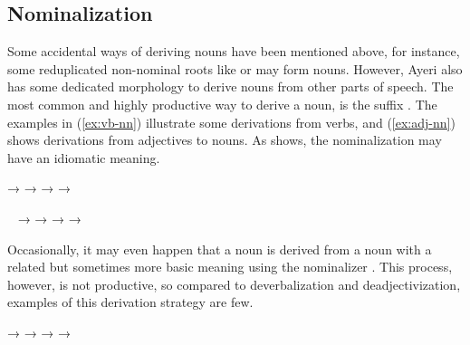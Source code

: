\subsection{Nominalization}

Some accidental ways of deriving nouns have been mentioned above, for instance, 
some reduplicated non-nominal roots like  or 
 may form nouns. However, Ayeri also has some 
dedicated morphology to derive nouns from other parts of speech. The most 
common and highly productive way to derive a noun, is the suffix 
. The examples in (\ref{ex:vb-nn}) illustrate some derivations 
from verbs, and (\ref{ex:adj-nn}) shows derivations from adjectives to nouns. 
As  shows, the nominalization may have an idiomatic 
meaning.

\pex\label{ex:vb-nn}
	\a {}
		→ 
	\a {}
		→ 
	\a {}
		→ 
	\a {}
		→ 
\xe

\pex~\label{ex:adj-nn}
	\a {}
		→ 
	\a {}
		→ 
	\a {}
		→ 
	\a {}
		→ 
\xe

Occasionally, it may even happen that a noun is derived from a noun with a 
related but sometimes more basic meaning using the nominalizer 
. 
This process, however, is not productive, so compared to deverbalization and 
deadjectivization, examples of this derivation strategy are few.

\pex\label{ex:nn-nn}
	\a {}
		→ 
	\a {}
		→ 
	\a {}
		→ 
	\a {}
		→ 
\xe

